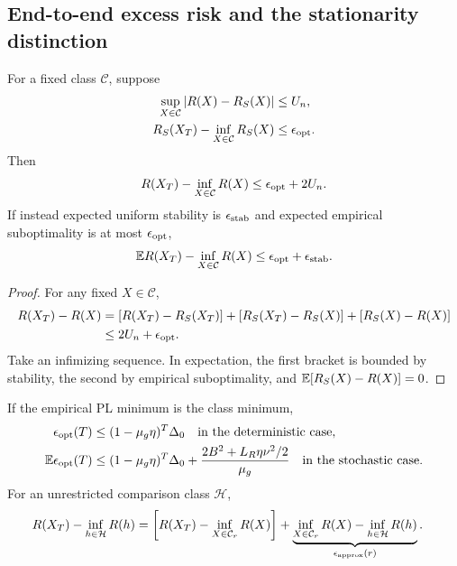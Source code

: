 \subsection{End-to-end excess risk and the stationarity distinction}
\begin{theorem}
\label{thm:excess-risk}
For a fixed class $\mathcal C$, suppose
\begin{align}
\sup_{X\in\mathcal C}|R(X)-R_S(X)|&\leq U_n,\\
R_S(X_T)-\inf_{X\in\mathcal C}R_S(X)&\leq\epsilon_{\rm opt}.
\end{align}
Then
\begin{equation}
R(X_T)-\inf_{X\in\mathcal C}R(X)
\leq\epsilon_{\rm opt}+2U_n .
\end{equation}
If instead expected uniform stability is $\epsilon_{\rm stab}$ and
expected empirical suboptimality is at most $\epsilon_{\rm opt}$,
\begin{equation}
\mathbb E R(X_T)-\inf_{X\in\mathcal C}R(X)
\leq\epsilon_{\rm opt}+\epsilon_{\rm stab}.
\label{eq:rigid-excess-risk}
\end{equation}
\end{theorem}
\begin{proof}
For any fixed $X\in\mathcal C$,
\begin{align}
R(X_T)-R(X)
&=[R(X_T)-R_S(X_T)]+[R_S(X_T)-R_S(X)]
+[R_S(X)-R(X)]\\
&\leq2U_n+\epsilon_{\rm opt}.
\end{align}
Take an infimizing sequence. In expectation, the first bracket is
bounded by stability, the second by empirical suboptimality, and
$\mathbb E[R_S(X)-R(X)]=0$.
\end{proof}

\begin{corollary}
If the empirical PL minimum is the class minimum,
\begin{align}
\epsilon_{\rm opt}(T)
&\leq(1-\mu_g\eta)^T\Delta_0
\quad\text{in the deterministic case},\\
\mathbb E\epsilon_{\rm opt}(T)
&\leq(1-\mu_g\eta)^T\Delta_0+
\frac{2B^2+L_R\eta\nu^2/2}{\mu_g}
\quad\text{in the stochastic case}.
\end{align}
For an unrestricted comparison class $\mathcal H$,
\begin{align}
R(X_T)-\inf_{h\in\mathcal H}R(h)
&=\left[R(X_T)-\inf_{X\in\mathcal C_r}R(X)\right]
+\underbrace{\inf_{X\in\mathcal C_r}R(X)
-\inf_{h\in\mathcal H}R(h)}_{\epsilon_{\rm approx}(r)} .
\end{align}
\end{corollary}

